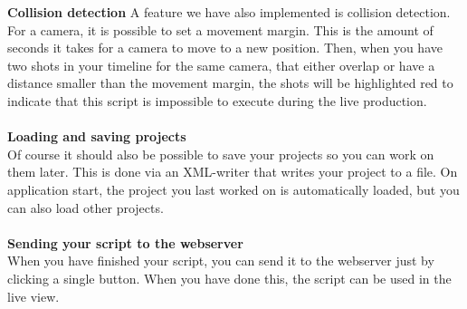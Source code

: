 \textbf{Collision detection}
A feature we have also implemented is collision detection. For a camera, it is possible to set a movement margin. This is the amount of seconds it takes for a camera to move to a new position. Then, when you have two shots in your timeline for the same camera, that either overlap or have a distance smaller than the movement margin, the shots will be highlighted red to indicate that this script is impossible to execute during the live production.\\\\
\textbf{Loading and saving projects}\\
Of course it should also be possible to save your projects so you can work on them later. This is done via an XML-writer that writes your project to a file. On application start, the project you last worked on is automatically loaded, but you can also load other projects.\\\\
\textbf{Sending your script to the webserver}\\
When you have finished your script, you can send it to the webserver just by clicking a single button. When you have done this, the script can be used in the live view.


